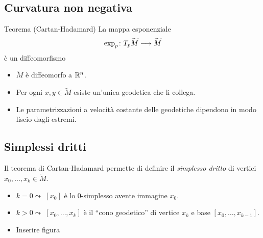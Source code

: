 \documentclass{beamer}
\begin{document}
\subsection{Curvatura non negativa}
\begin{frame}{\secname}{\subsecname}
\begin{block}{Teorema (Cartan-Hadamard)}
La mappa esponenziale
\[
\map{\exp_p}{T_p\widetilde M}{\widetilde M}
\]
è un diffeomorfismo
\end{block}
\begin{itemize}
\item $\widetilde M$ è diffeomorfo a $\mathbb{R}^n$.
\item Per ogni $x,y\in\widetilde M$ esiste un'unica geodetica che li collega.
\item Le parametrizzazioni a velocità costante delle geodetiche dipendono in modo liscio dagli estremi.
\end{itemize}
\end{frame}
\subsection{Simplessi dritti}
\begin{frame}{\secname}{\subsecname}
Il teorema di Cartan-Hadamard permette di definire il \emph{simplesso dritto} di vertici $x_0,\ldots,x_k\in\widetilde M$.

\begin{minipage}[t]{.6\textwidth}
\begin{itemize}
\item $k=0\leadsto$ $[x_0]$ è lo $0$-simplesso avente immagine $x_0$.
\item $k>0\leadsto$ $[x_0,\ldots,x_k]$ è il ``cono geodetico'' di vertice $x_k$ e base $[x_0,\ldots,x_{k-1}]$.
\end{itemize}
\end{minipage}
\begin{minipage}[t]{.35\textwidth}
\begin{itemize}
\item \huge Inserire figura
\end{itemize}
\end{minipage}
\end{frame}
\end{document}
